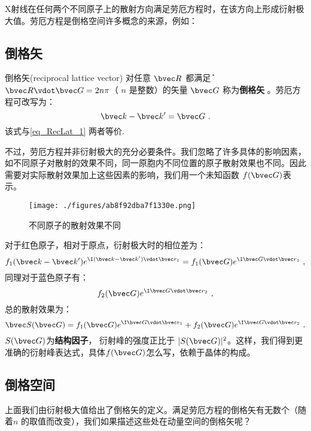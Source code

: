 X射线在任何两个不同原子上的散射方向满足劳厄方程时，在该方向上形成衍射极大值。劳厄方程是倒格空间许多概念的来源，例如：

\subsection{倒格矢}
\begin{definition}{倒格矢(reciprocal lattice vector)}
对任意 $\bvec R$ 都满足݊ $\bvec R \vdot \bvec G = 2 n \pi$（ $n$ 是整数）的矢量 $\bvec G$ 称为\textbf{倒格矢}
 。劳厄方程可改写为：
\begin{equation}
\bvec k -\bvec k' = \bvec G~.
\end{equation}
该式与\autoref{eq_RecLat_1} 两者等价.
\end{definition}

不过，劳厄方程并非衍射极大的充分必要条件。我们忽略了许多具体的影响因素，如不同原子对散射的效果不同，同一原胞内不同位置的原子散射效果也不同。因此需要对实际散射效果加上这些因素的影响，我们用一个未知函数 $f(\bvec G)$表示。

\begin{figure}[ht]
\centering
\texttt{[image: ./figures/ab8f92dba7f1330e.png]}
\caption{不同原子的散射效果不同} \label{fig_RecLat_4}
\end{figure}

对于红色原子，相对于原点，衍射极大时的相位差为：
\begin{equation}
f_1(\bvec k -\bvec k') e^{\I (\bvec k -\bvec k') \vdot \bvec r_1} =f_1(\bvec G) e^{\I \bvec G \vdot \bvec r_1}~,
\end{equation}
同理对于蓝色原子有：
\begin{equation}
f_2(\bvec G) e^{\I \bvec G \vdot \bvec r_2}~,
\end{equation}
总的散射效果为：
\begin{equation}
\bvec S (\bvec G) = f_1(\bvec G) e^{\I \bvec G \vdot \bvec r_1} + f_2(\bvec G) e^{\I \bvec G \vdot \bvec r_2}~.
\end{equation}
$S (\bvec G)$为\textbf{结构因子}， 衍射峰的强度正比于 $|S(\bvec G)|^2$。这样，我们得到更准确的衍射峰表达式，具体$f(\bvec G)$怎么写，依赖于晶体的构成。

\subsection{倒格空间}
上面我们由衍射极大值给出了倒格矢的定义。满足劳厄方程的倒格矢有无数个（随着$n$ 的取值而改变），我们如果描述这些处在动量空间的倒格矢呢？

